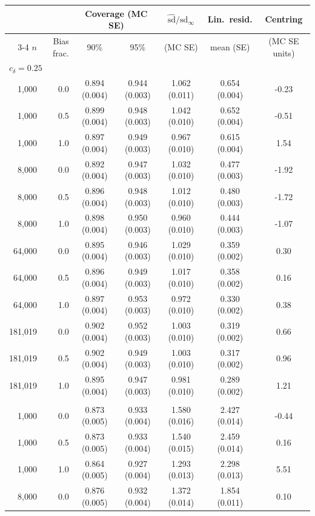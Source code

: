 \begin{tabular}{rrccccc}
\toprule
 & & \multicolumn{2}{c}{Coverage (MC SE)} & $\hat{\mathrm{sd}}/\mathrm{sd}_\infty$ & Lin.\ resid. & Centring \\
\cmidrule(lr){3-4}
$n$ & Bias frac. & 90\% & 95\% & (MC SE) & mean (SE) & (MC SE units) \\
\midrule
\multicolumn{7}{l}{\textit{$c_\delta=0.25$}} \\
\midrule
1,000 & 0.0 & 0.894 (0.004) & 0.944 (0.003) & 1.062 (0.011) & 0.654 (0.004) & -0.23 \\
1,000 & 0.5 & 0.899 (0.004) & 0.948 (0.003) & 1.042 (0.010) & 0.652 (0.004) & -0.51 \\
1,000 & 1.0 & 0.897 (0.004) & 0.949 (0.003) & 0.967 (0.010) & 0.615 (0.004) & 1.54 \\
8,000 & 0.0 & 0.892 (0.004) & 0.947 (0.003) & 1.032 (0.010) & 0.477 (0.003) & -1.92 \\
8,000 & 0.5 & 0.896 (0.004) & 0.948 (0.003) & 1.012 (0.010) & 0.480 (0.003) & -1.72 \\
8,000 & 1.0 & 0.898 (0.004) & 0.950 (0.003) & 0.960 (0.010) & 0.444 (0.003) & -1.07 \\
64,000 & 0.0 & 0.895 (0.004) & 0.946 (0.003) & 1.029 (0.010) & 0.359 (0.002) & 0.30 \\
64,000 & 0.5 & 0.896 (0.004) & 0.949 (0.003) & 1.017 (0.010) & 0.358 (0.002) & 0.16 \\
64,000 & 1.0 & 0.897 (0.004) & 0.953 (0.003) & 0.972 (0.010) & 0.330 (0.002) & 0.38 \\
181,019 & 0.0 & 0.902 (0.004) & 0.952 (0.003) & 1.003 (0.010) & 0.319 (0.002) & 0.66 \\
181,019 & 0.5 & 0.902 (0.004) & 0.949 (0.003) & 1.003 (0.010) & 0.317 (0.002) & 0.96 \\
181,019 & 1.0 & 0.895 (0.004) & 0.947 (0.003) & 0.981 (0.010) & 0.289 (0.002) & 1.21 \\
\addlinespace
\multicolumn{7}{l}{\textit{$c_\delta=1.00$}} \\
\midrule
1,000 & 0.0 & 0.873 (0.005) & 0.933 (0.004) & 1.580 (0.016) & 2.427 (0.014) & -0.44 \\
1,000 & 0.5 & 0.873 (0.005) & 0.933 (0.004) & 1.540 (0.015) & 2.459 (0.014) & 0.16 \\
1,000 & 1.0 & 0.864 (0.005) & 0.927 (0.004) & 1.293 (0.013) & 2.298 (0.013) & 5.51 \\
8,000 & 0.0 & 0.876 (0.005) & 0.932 (0.004) & 1.372 (0.014) & 1.854 (0.011) & 0.10 \\

\end{tabular}
